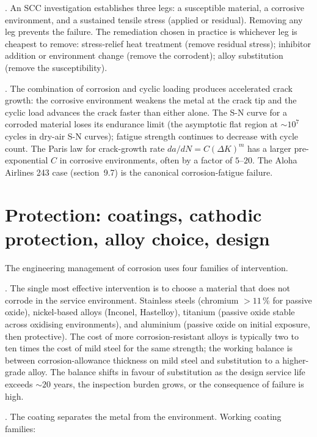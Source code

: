 . An SCC investigation establishes
three legs: a susceptible material, a corrosive environment, and a
sustained tensile stress (applied or residual). Removing any leg
prevents the failure. The remediation chosen in practice is whichever
leg is cheapest to remove: stress-relief heat treatment (remove
residual stress); inhibitor addition or environment change (remove
the corrodent); alloy substitution (remove the susceptibility).

. The combination of corrosion and cyclic
loading produces accelerated crack growth: the corrosive environment
weakens the metal at the crack tip and the cyclic load advances the
crack faster than either alone. The S-N curve for a corroded material
loses its endurance limit (the asymptotic flat region at $\sim 10^7$
cycles in dry-air S-N curves); fatigue strength continues to decrease
with cycle count. The Paris law for crack-growth rate
$da/dN = C(\Delta K)^m$ has a larger pre-exponential $C$ in corrosive
environments, often by a factor of $5$--$20$. The Aloha Airlines 243
case (section~9.7) is the canonical corrosion-fatigue failure.

\section{Protection: coatings, cathodic protection, alloy choice, design}

The engineering management of corrosion uses four families of
intervention.

. The single most effective intervention is to
choose a material that does not corrode in the service environment.
Stainless steels (chromium $> 11\,\%$ for passive oxide), nickel-based
alloys (Inconel, Hastelloy), titanium (passive oxide stable across
oxidising environments), and aluminium (passive oxide on initial
exposure, then protective). The cost of more corrosion-resistant
alloys is typically two to ten times the cost of mild steel for the
same strength; the working balance is between corrosion-allowance
thickness on mild steel and substitution to a higher-grade alloy. The
balance shifts in favour of substitution as the design service life
exceeds $\sim 20$ years, the inspection burden grows, or the
consequence of failure is high.

. The coating separates the metal from the
environment. Working coating families:

